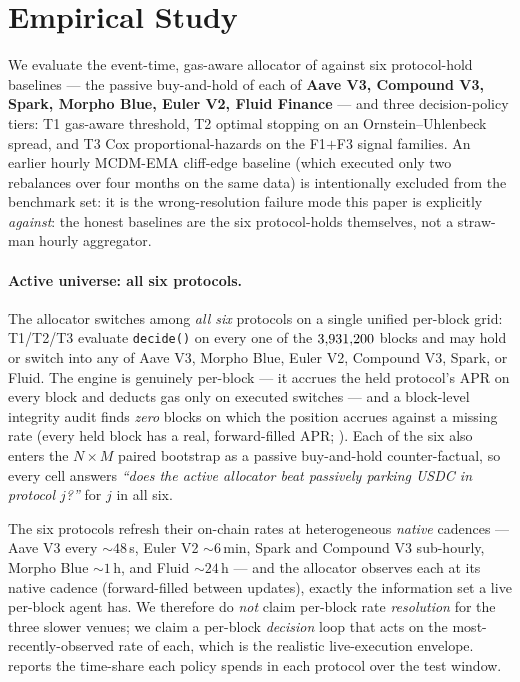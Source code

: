 \section{Empirical Study}
\label{sec:empirical}

We evaluate the event-time, gas-aware allocator of
 against six protocol-hold baselines --- the
passive buy-and-hold of each of \textbf{Aave V3, Compound V3, Spark,
Morpho Blue, Euler V2, Fluid Finance} --- and three decision-policy
tiers: T1 gas-aware threshold, T2 optimal stopping on an
Ornstein--Uhlenbeck spread, and T3 Cox proportional-hazards on the
F1$+$F3 signal families.  An earlier hourly MCDM-EMA cliff-edge baseline (which executed only
two rebalances over four months on the same data) is intentionally
excluded from the benchmark set: it is the wrong-resolution failure
mode this paper is explicitly \emph{against}: the honest baselines are the six protocol-holds
themselves, not a straw-man hourly aggregator.

\paragraph{Active universe: all six protocols.}
The allocator switches among \emph{all six} protocols on a single
unified per-block grid: T1/T2/T3 evaluate \texttt{decide()} on every
one of the $3{,}931{,}200$ blocks and may hold or switch into any of
Aave V3, Morpho Blue, Euler V2, Compound V3, Spark, or Fluid.  The
engine is genuinely per-block --- it accrues the held protocol's APR
on every block and deducts gas only on executed switches --- and a
block-level integrity audit finds \emph{zero} blocks on which the
position accrues against a missing rate (every held block has a
real, forward-filled APR; ).  Each of the six
also enters the $N\!\times\!M$ paired bootstrap as a passive
buy-and-hold counter-factual, so every cell answers \emph{``does the
active allocator beat passively parking USDC in protocol $j$?''} for
$j$ in all six.

The six protocols refresh their on-chain rates at heterogeneous
\emph{native} cadences --- Aave V3 every $\sim 48$\,s, Euler V2
$\sim 6$\,min, Spark and Compound V3 sub-hourly, Morpho Blue
$\sim 1$\,h, and Fluid $\sim 24$\,h --- and the allocator observes
each at its native cadence (forward-filled between updates), exactly
the information set a live per-block agent has.  We therefore do
\emph{not} claim per-block rate \emph{resolution} for the three
slower venues; we claim a per-block \emph{decision} loop that acts
on the most-recently-observed rate of each, which is the realistic
live-execution envelope.   reports the
time-share each policy spends in each protocol over the test window.

